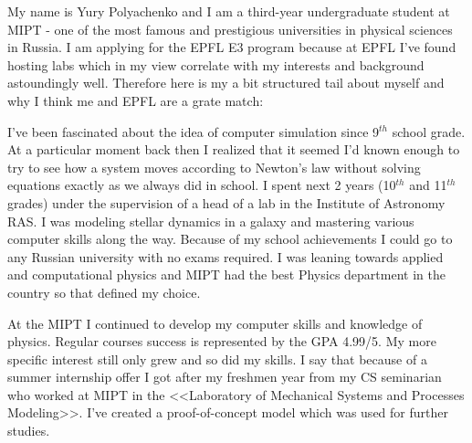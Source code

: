 \documentclass[11pt, a4paper]{awesome-cv}
\begin{document}
\begin{cvletter}


\hspace{10pt} My name is Yury Polyachenko and I am a third-year undergraduate student at MIPT - one of the most famous and prestigious universities in physical sciences in Russia. I am applying for the EPFL E3 program because at EPFL I've found hosting labs which in my view correlate with my interests and background astoundingly well. Therefore here is my a bit structured tail about myself and why I think me and EPFL are a grate match:

I've been fascinated about the idea of computer simulation since 9$^{th}$ school grade. At a particular moment back then I realized that it seemed I'd known enough to try to see how a system moves according to Newton's law without solving equations exactly as we always did in school. I spent next 2 years (10$^{th}$ and 11$^{th}$ grades) under the supervision of a head of a lab in the Institute of Astronomy RAS. I was modeling stellar dynamics in a galaxy and mastering various computer skills along the way. Because of my school achievements I could go to any Russian university with no exams required. I was leaning towards applied and computational physics and MIPT had the best Physics department in the country so that defined my choice. 

At the MIPT I continued to develop my computer skills and knowledge of physics. Regular courses success is represented by the GPA 4.99/5. My more specific interest still only grew and so did my skills. I say that because of a summer internship offer I got after my freshmen year from my CS seminarian who worked at MIPT in the <<Laboratory of Mechanical Systems and Processes Modeling>>. I've created a proof-of-concept model which was used for further studies. 


\end{cvletter}
\end{document}
